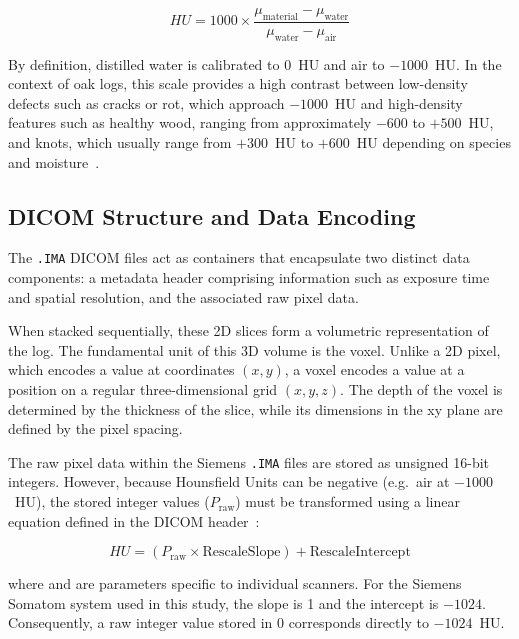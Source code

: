 \begin{equation}
 HU = 1000 \times
 \frac{\mu_{\text{material}} - \mu_{\text{water}}}
{\mu_{\text{water}} - \mu_{\text{air}}}
 \label{eq:hu_definition}
\end{equation}

By definition, distilled water is calibrated to 0~HU and air to $-1000$~HU. In
the context of oak logs, this scale provides a high contrast between low-density
defects such as cracks or rot, which approach $-1000$~HU and high-density
features such as healthy wood, ranging from approximately $-600$ to $+500$~HU,
and knots, which usually range from $+300$~HU to $+600$~HU depending on species and moisture~\cite{freyburger2009measuring}.

\subsection{DICOM Structure and Data Encoding}

The \texttt{.IMA} DICOM files act as containers that encapsulate two distinct
data components: a metadata header comprising information such as exposure
time and spatial resolution, and the associated raw pixel data.

When stacked sequentially, these 2D slices form a volumetric representation of
the log. The fundamental unit of this 3D volume is the voxel. Unlike a 2D pixel, which encodes a value at coordinates $(x, y)$, a
voxel encodes a value at a position on a regular three-dimensional grid 
$(x, y, z)$. The depth of the voxel is determined by the thickness of the slice, while its dimensions in the xy plane are defined by the pixel spacing.

The raw pixel data within the Siemens \texttt{.IMA} files are stored as
unsigned 16-bit integers. However, because Hounsfield Units can be negative
(e.g.\ air at $-1000$~HU), the stored integer values ($P_{\text{raw}}$) must
be transformed using a linear equation defined in the DICOM header~\cite{dicom_standard}:

\begin{equation}
    HU = (P_{\text{raw}} \times \text{RescaleSlope}) + \text{RescaleIntercept}
    \label{eq:dicom_conversion}
\end{equation}

\noindent where  and  are parameters specific to individual scanners. For the Siemens Somatom system used in this study, the slope is 1 and the intercept is $-1024$. Consequently, a raw integer value stored in $0$ corresponds directly to $-1024$~HU.

